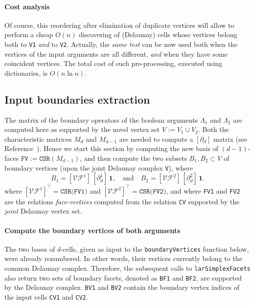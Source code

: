 \documentclass[11pt,oneside]{article}	%
\begin{document}
\paragraph{Cost analysis} 
Of course, this reordering after elimination of duplicate vertices will allow to perform a cheap $O(n)$ discovering of (Delaunay) cells whose vertices belong both to \texttt{V1} \emph{and} to \texttt{V2}. 
Actually, the \emph{same test} can be now used both when the vertices of the input arguments are all different, \emph{and} when they have some coincident vertices.
The total cost of such pre-processing, executed using dictionaries, is $O(n\ln n)$.

\subsection{Input boundaries extraction}

The matrix of the boundary operators of the boolean arguments $\Lambda_1$ and $\Lambda_2$ are computed here as supported by the novel vertex set $V := V_1 \cup V_2$. Both the characteristic matrices $M_d$ and $M_{d-1}$ are needed to compute a $[\partial_d]$ matrix (see Reference~\cite{Dicarlo:2014:TNL:2543138.2543294}). Hence we start this section by computing the new basis of $(d-1)$-faces $\texttt{FV} := \texttt{CSR}(M_{d-1})$, and then compute the two subsets $B_1,B_2 \subset V$ of boundary vertices (upon the joint Delaunay complex \texttt{V}), where
\[
B_1 = [\mathcal{VF}^1]\, [\partial_d^1]\,\mathbf{1},
\quad\mbox{and}\quad
B_2 = [\mathcal{VF}^2]\, [\partial_d^2]\,\mathbf{1}.
\]
where $[\mathcal{VF}^1]^\top = \texttt{CSR(FV1)}$ and $[\mathcal{VF}^2]^\top = \texttt{CSR(FV2)}$,
and where \texttt{FV1} and \texttt{FV2} are the relations \emph{face-vertices} computed from the relation \texttt{CV} supported by the \emph{joint} Delaunay vertex set. 

\paragraph{Compute the boundary vertices of both arguments}
The two bases of $d$-cells, given as input to the \texttt{boundaryVertices} function below, were already renumbered. In other words, their vertices currently belong to the common Delaunay complex. Therefore, the subsequent calls to \texttt{larSimplexFacets} also return two sets of boundary facets, denoted as \texttt{BF1} and \texttt{BF2}, are supported by the Delaunay complex. \texttt{BV1} and \texttt{BV2} contain the boundary vertex indices of the input cells \texttt{CV1} and \texttt{CV2}.
\end{document}
